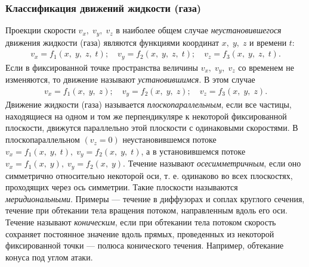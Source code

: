 	\subsubsection{Классификация движений жидкости (газа)}\label{sec:fluid-moving-classification}
	Проекции скорости $v_x,\; v_y,\; v_z$ в наиболее общем случае \textit{неустановившегося} движения жидкости (газа) являются функциями координат $x,\; y,\; z$ и времени $t$:
	\begin{gather}
		v_x = f_1(x,\;y,\;z,\;t);\quad v_y = f_2(x,\;y,\;z,\;t);\quad v_z = f_3(x,\;y,\;z,\;t).
	\end{gather}\n
	Если в фиксированной точке пространства величины $v_x,\; v_y,\; v_z$ со временем не изменяются, то движение называют \textit{установившимся}. В этом случае
	\begin{gather}
		v_x = f_1(x,\; y,\; z);\quad v_y = f_2(x,\;y,\;z);\quad v_z = f_3(x,\;y,\;z).
	\end{gather}\n
	Движение жидкости (газа) называется \textit{плоскопараллельным}, если все частицы, находящиеся на одном и том же перпендикуляре к некоторой фиксированной плоскости, движутся параллельно этой плоскости с одинаковыми скоростями. В плоскопараллельном $\left(v_z=0\right)$ неустановившемся потоке $v_x = f_1(x,\; y,\; t),\; v_y = f_2(x,\; y,\; t)$, а в установившемся потоке $v_x = f_1(x,\; y),\; v_y = f_2(x,\; y)$.\n
	Течение называют \textit{осесимметричным}, если оно симметрично относительно некоторой оси, т. е. одинаково во всех плоскостях, проходящих через ось симметрии. Такие плоскости называются \textit{меридиональными}. Примеры --- течение в диффузорах и соплах круглого сечения, течение при обтекании тела вращения потоком, направленным вдоль его оси.\n
	Течение называют \textit{коническим}, если при обтекании тела потоком скорость сохраняет постоянное значение вдоль прямых, проведенных из некоторой фиксированной точки --- полюса конического течения. Например, обтекание конуса под углом атаки.
	
